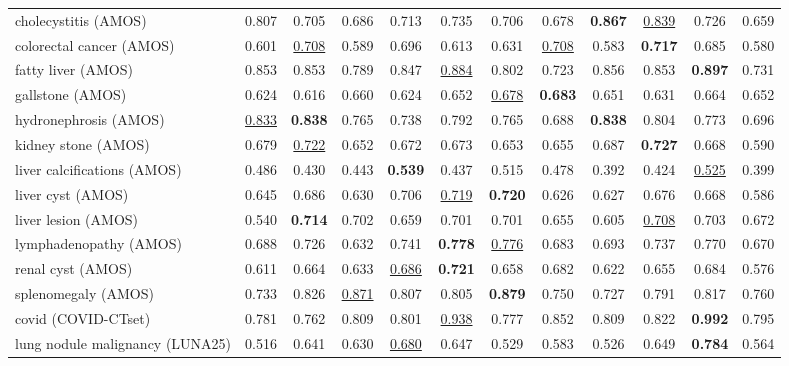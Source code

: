 \begin{minipage}{\textwidth}
{\begin{tabular}{@{}lccccccccccc@{}}
cholecystitis (AMOS) & 0.807 & 0.705 & 0.686 & 0.713 & 0.735 & 0.706 & 0.678 & \textbf{0.867} & \underline{0.839} & 0.726 & 0.659 \\
colorectal cancer (AMOS) & 0.601 & \underline{0.708} & 0.589 & 0.696 & 0.613 & 0.631 & \underline{0.708} & 0.583 & \textbf{0.717} & 0.685 & 0.580 \\
fatty liver (AMOS) & 0.853 & 0.853 & 0.789 & 0.847 & \underline{0.884} & 0.802 & 0.723 & 0.856 & 0.853 & \textbf{0.897} & 0.731 \\
gallstone (AMOS) & 0.624 & 0.616 & 0.660 & 0.624 & 0.652 & \underline{0.678} & \textbf{0.683} & 0.651 & 0.631 & 0.664 & 0.652 \\
hydronephrosis (AMOS) & \underline{0.833} & \textbf{0.838} & 0.765 & 0.738 & 0.792 & 0.765 & 0.688 & \textbf{0.838} & 0.804 & 0.773 & 0.696 \\
kidney stone (AMOS) & 0.679 & \underline{0.722} & 0.652 & 0.672 & 0.673 & 0.653 & 0.655 & 0.687 & \textbf{0.727} & 0.668 & 0.590 \\
liver calcifications (AMOS) & 0.486 & 0.430 & 0.443 & \textbf{0.539} & 0.437 & 0.515 & 0.478 & 0.392 & 0.424 & \underline{0.525} & 0.399 \\
liver cyst (AMOS) & 0.645 & 0.686 & 0.630 & 0.706 & \underline{0.719} & \textbf{0.720} & 0.626 & 0.627 & 0.676 & 0.668 & 0.586 \\
liver lesion (AMOS) & 0.540 & \textbf{0.714} & 0.702 & 0.659 & 0.701 & 0.701 & 0.655 & 0.605 & \underline{0.708} & 0.703 & 0.672 \\
lymphadenopathy (AMOS) & 0.688 & 0.726 & 0.632 & 0.741 & \textbf{0.778} & \underline{0.776} & 0.683 & 0.693 & 0.737 & 0.770 & 0.670 \\
renal cyst (AMOS) & 0.611 & 0.664 & 0.633 & \underline{0.686} & \textbf{0.721} & 0.658 & 0.682 & 0.622 & 0.655 & 0.684 & 0.576 \\
splenomegaly (AMOS) & 0.733 & 0.826 & \underline{0.871} & 0.807 & 0.805 & \textbf{0.879} & 0.750 & 0.727 & 0.791 & 0.817 & 0.760 \\
covid (COVID-CTset) & 0.781 & 0.762 & 0.809 & 0.801 & \underline{0.938} & 0.777 & 0.852 & 0.809 & 0.822 & \textbf{0.992} & 0.795 \\
lung nodule malignancy (LUNA25) & 0.516 & 0.641 & 0.630 & \underline{0.680} & 0.647 & 0.529 & 0.583 & 0.526 & 0.649 & \textbf{0.784} & 0.564 \\
\bottomrule
\end{tabular}
}\end{minipage}
\par\bigskip
